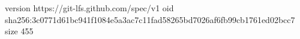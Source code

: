 version https://git-lfs.github.com/spec/v1
oid sha256:3c0771d61bc941f1084e5a3ac7c11fad58265bd7026af6fb99cb1761ed02bcc7
size 455
